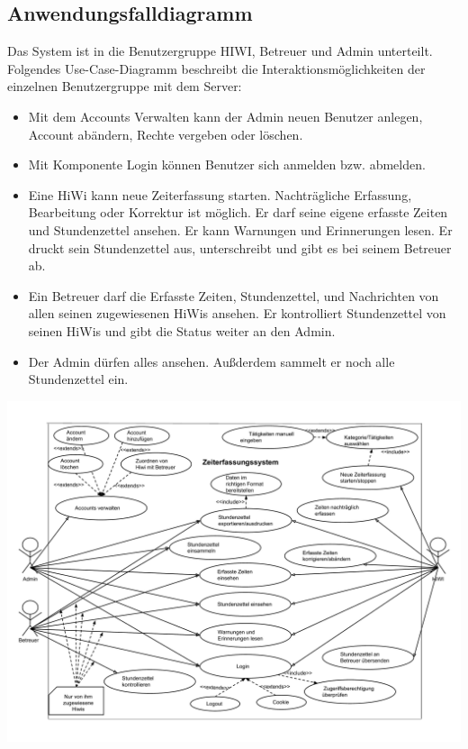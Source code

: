 \newpage
\subsection{Anwendungsfalldiagramm}
Das System ist in die Benutzergruppe HIWI, Betreuer und Admin unterteilt. Folgendes Use-Case-Diagramm beschreibt die Interaktionsmöglichkeiten der einzelnen Benutzergruppe mit dem Server:
\begin{itemize}
	\item Mit dem Accounts Verwalten kann der Admin neuen Benutzer anlegen, Account abändern, Rechte vergeben oder löschen.
	\item Mit Komponente Login können Benutzer sich anmelden bzw. abmelden.
	\item Eine HiWi kann neue Zeiterfassung starten. Nachträgliche Erfassung, Bearbeitung oder Korrektur ist möglich. Er darf seine eigene erfasste Zeiten und Stundenzettel ansehen. Er kann Warnungen und Erinnerungen lesen. Er druckt sein Stundenzettel aus, unterschreibt und gibt es bei seinem Betreuer ab.
	\item Ein Betreuer darf die Erfasste Zeiten, Stundenzettel, und Nachrichten von allen seinen zugewiesenen HiWis ansehen. Er kontrolliert Stundenzettel von seinen HiWis und gibt die Status weiter an den Admin.
	\item Der Admin dürfen alles ansehen. Außderdem sammelt er noch alle Stundenzettel ein.
\end{itemize}


\includegraphics[width=\linewidth]{Anwendungsfalldiagramm.pdf}\\
